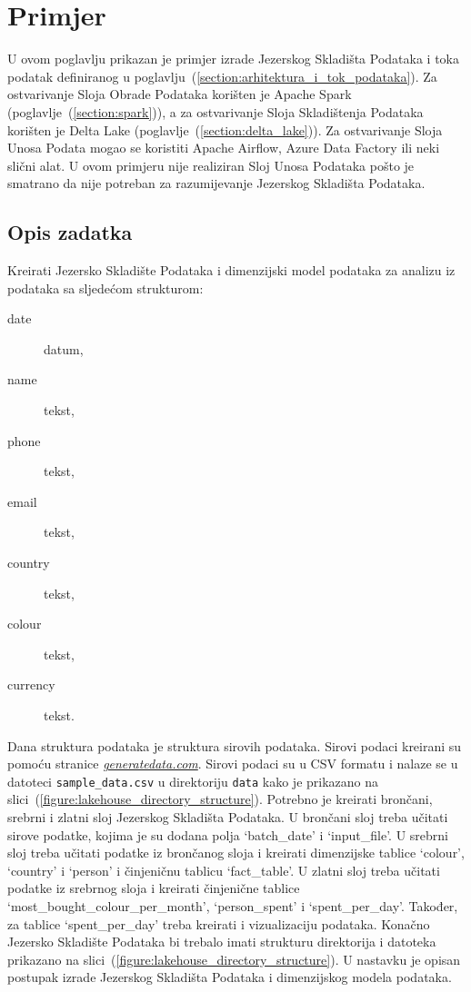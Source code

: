 \chapter{Primjer} \label{chapter:primjer}

U ovom poglavlju prikazan je primjer izrade Jezerskog Skladišta Podataka i toka
podatak definiranog u poglavlju~(\ref{section:arhitektura_i_tok_podataka}). Za
ostvarivanje Sloja Obrade Podataka korišten je Apache Spark
(poglavlje~(\ref{section:spark})), a za ostvarivanje Sloja Skladištenja Podataka
korišten je Delta Lake (poglavlje~(\ref{section:delta_lake})). Za ostvarivanje
Sloja Unosa Podata mogao se koristiti Apache Airflow, Azure Data Factory ili
neki slični alat. U ovom primjeru nije realiziran Sloj Unosa Podataka pošto je
smatrano da nije potreban za razumijevanje Jezerskog Skladišta Podataka.

\section{Opis zadatka} \label{section:opis_zadatka}

Kreirati Jezersko Skladište Podataka i dimenzijski model podataka za analizu
iz podataka sa sljedećom strukturom:
\begin{description}
    \item[date] datum,
    \item[name] tekst,
    \item[phone] tekst,
    \item[email] tekst,
    \item[country] tekst,
    \item[colour] tekst,
    \item[currency] tekst.      
\end{description}
Dana struktura podataka je struktura sirovih podataka. Sirovi podaci kreirani su
pomoću stranice \href{https://generatedata.com/}{\textit{generatedata.com}}. Sirovi
podaci su u CSV formatu i nalaze se u datoteci \texttt{sample\_data.csv} u
direktoriju \texttt{data} kako je prikazano na
slici~(\ref{figure:lakehouse_directory_structure}). Potrebno je kreirati
brončani, srebrni i zlatni sloj Jezerskog Skladišta Podataka. U brončani sloj
treba učitati sirove podatke, kojima je su dodana polja `batch\_date' i
`input\_file'. U srebrni sloj treba učitati podatke iz brončanog sloja i
kreirati dimenzijske tablice `colour', `country' i `person' i činjeničnu
tablicu `fact\_table'. U zlatni sloj treba učitati podatke iz srebrnog sloja i
kreirati činjenične tablice `most\_bought\_colour\_per\_month', `person\_spent'
i `spent\_per\_day'. Također, za tablice `spent\_per\_day' treba kreirati i
vizualizaciju podataka. Konačno Jezersko Skladište Podataka bi trebalo imati
strukturu direktorija i datoteka prikazano na
slici~(\ref{figure:lakehouse_directory_structure}). U nastavku je opisan
postupak izrade Jezerskog Skladišta Podataka i dimenzijskog modela podataka.

